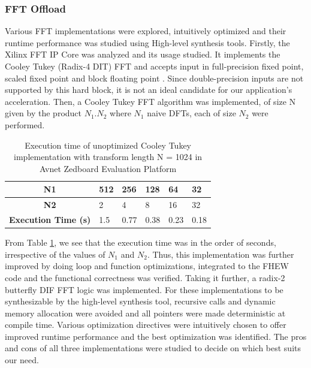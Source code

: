 \subsubsection*{FFT Offload}
Various FFT implementations were explored, intuitively optimized and their runtime performance was studied using High-level synthesis tools.
Firstly, the Xilinx FFT IP Core \cite{logicore2012fast} was analyzed and its usage studied. It implements the Cooley Tukey (Radix-4 DIT) FFT and accepts input in full-precision fixed point, scaled fixed point and block floating point . Since double-precision inputs are not supported by this hard block, it is not an ideal candidate for our application's acceleration. Then, a Cooley Tukey FFT algorithm was implemented, of size N given by the product $N_1$.$N_2$ where $N_1$ naive DFTs, each of size $N_2$ were performed. 
\begin{table}[htbp]
\centering
\caption{Execution time of unoptimized Cooley Tukey implementation with transform length N = 1024 in Avnet Zedboard Evaluation Platform}
\label{tab:ct_fft_1}
\begin{tabular}{|c|l|l|l|l|l|}
\hline
\textbf{N1} & 512 & 256 & 128 & 64 & 32 \\ \hline
\textbf{N2} & 2 & 4 & 8 & 16 & 32 \\ \hline
\textbf{Execution Time (s)} & 1.5 & 0.77 & 0.38 & 0.23 & 0.18 \\ \hline
\end{tabular}
\end{table}
From Table \ref{tab:ct_fft_1}, we see that the execution time was in the order of seconds, irrespective of the values of $N_1$ and $N_2$. Thus, this implementation was further improved by doing loop and function optimizations, integrated to the FHEW code and the functional correctness was verified. Taking it further, a radix-2 butterfly DIF FFT logic was implemented. \newline \newline For these implementations to be synthesizable by the high-level synthesis tool, recursive calls and dynamic memory allocation were avoided and all pointers were made deterministic at compile time. Various optimization directives were intuitively chosen to offer improved runtime performance and the best optimization was identified. The pros and cons of all three implementations were studied to decide on which best suits our need.  
